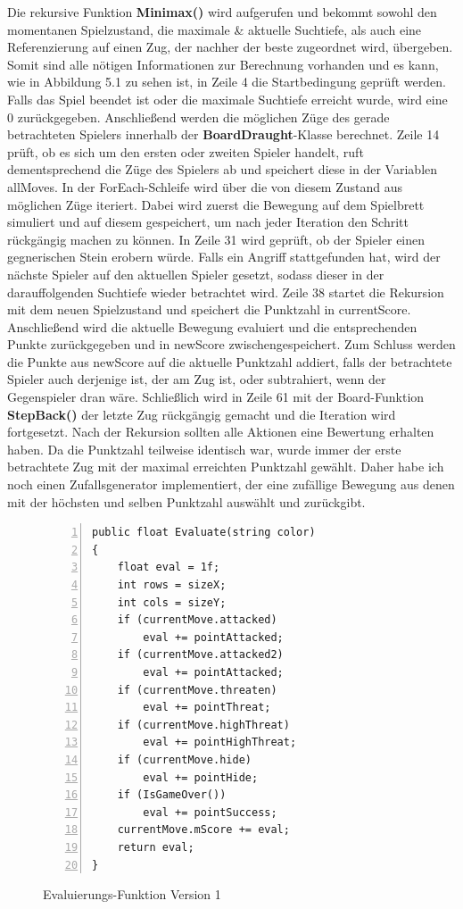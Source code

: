 Die rekursive Funktion \textbf{Minimax()} wird aufgerufen und bekommt sowohl den momentanen Spielzustand, die maximale \& aktuelle Suchtiefe, als auch eine Referenzierung auf einen Zug, der nachher der beste zugeordnet wird, übergeben. Somit sind alle nötigen Informationen zur Berechnung vorhanden und es kann, wie in Abbildung 5.1 zu sehen ist, in Zeile 4 die Startbedingung geprüft werden. Falls das Spiel beendet ist oder die maximale Suchtiefe erreicht wurde, wird eine 0 zurückgegeben. Anschließend werden die möglichen Züge des gerade betrachteten Spielers innerhalb der \textbf{BoardDraught}-Klasse berechnet. Zeile 14 prüft, ob es sich um den ersten oder zweiten Spieler handelt, ruft dementsprechend die Züge des Spielers ab und speichert diese in der Variablen allMoves. In der ForEach-Schleife wird über die von diesem Zustand aus möglichen Züge iteriert. Dabei wird zuerst die Bewegung auf dem Spielbrett simuliert und auf diesem gespeichert, um nach jeder Iteration den Schritt rückgängig machen zu können. In Zeile 31 wird geprüft, ob der Spieler einen gegnerischen Stein erobern würde. Falls ein Angriff stattgefunden hat, wird der nächste Spieler auf den aktuellen Spieler gesetzt, sodass dieser in der darauffolgenden Suchtiefe wieder betrachtet wird. Zeile 38 startet die Rekursion mit dem neuen Spielzustand und speichert die Punktzahl in currentScore. Anschließend wird die aktuelle Bewegung evaluiert und die entsprechenden Punkte zurückgegeben und in newScore zwischengespeichert. Zum Schluss werden die Punkte aus newScore auf die aktuelle Punktzahl addiert, falls der betrachtete Spieler auch derjenige ist, der am Zug ist, oder subtrahiert, wenn der Gegenspieler dran wäre. Schließlich wird in Zeile 61 mit der Board-Funktion \textbf{StepBack()} der letzte Zug rückgängig gemacht und die Iteration wird fortgesetzt. Nach der Rekursion sollten alle Aktionen eine Bewertung erhalten haben. Da die Punktzahl teilweise identisch war, wurde immer der erste betrachtete Zug mit der maximal erreichten Punktzahl gewählt. Daher habe ich noch einen Zufallsgenerator implementiert, der eine zufällige Bewegung aus denen mit der höchsten und selben Punktzahl auswählt und zurückgibt.\\
\begin{figure}[h]
\begin{lstlisting}[basicstyle=\scriptsize\ttfamily, numbers=left, stepnumber=1, numberstyle = \tiny]
public float Evaluate(string color)
{
	float eval = 1f;
	int rows = sizeX;
	int cols = sizeY;
	if (currentMove.attacked)
		eval += pointAttacked;
	if (currentMove.attacked2)
		eval += pointAttacked;
	if (currentMove.threaten)
		eval += pointThreat;
	if (currentMove.highThreat)
		eval += pointHighThreat;
	if (currentMove.hide)
		eval += pointHide;
	if (IsGameOver())
		eval += pointSuccess;
	currentMove.mScore += eval;
	return eval;
}
\end{lstlisting}
\label{fig:eval1}
\caption{Evaluierungs-Funktion Version 1}
\end{figure}
